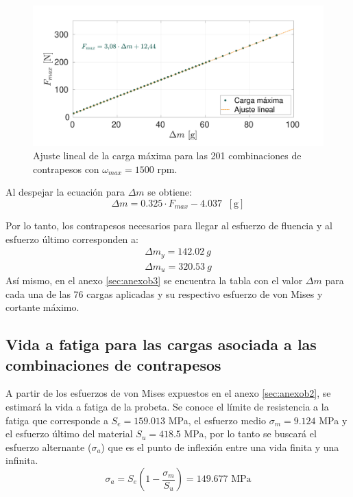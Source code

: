 \begin{figure}[h]
\centering
\includegraphics[width=1\linewidth, trim={1cm 0cm 2cm 0cm}, clip]{Imagenes/fmax_dmec.pdf}
\caption{Ajuste lineal de la carga máxima para las 201 combinaciones de contrapesos con $\omega_{max}=1500$ rpm.}
\label{fig:fmax_dmec}
\end{figure}
Al despejar la ecuación para $\Delta m$ se obtiene: 
\begin{equation}\label{eq:deltam}
	\Delta m = 0.325\cdot F_{max} - 4.037 \;\; [\text{g}]
\end{equation}

Por lo tanto, los contrapesos necesarios para llegar al esfuerzo de fluencia y al esfuerzo último corresponden a:
\begin{gather*}
	\Delta m_y = 142.02 \: g \\
	\Delta m_u = 320.53 \: g
\end{gather*}
Así mismo, en el anexo \ref{sec:anexob3} se encuentra la tabla con el valor $\Delta m$ para cada una de las 76 cargas aplicadas y su respectivo esfuerzo de von Mises y cortante máximo.

\subsection{Vida a fatiga para las cargas asociada a las combinaciones de contrapesos}

A partir de los esfuerzos de von Mises expuestos en el anexo \ref{sec:anexob2}, se estimará la vida a fatiga de la probeta. Se conoce el límite de resistencia a la fatiga que corresponde a $S_e = 159.013$ MPa, el esfuerzo medio $\sigma_m = 9.124$ MPa y el esfuerzo último del material $S_u = 418.5$ MPa, por lo tanto se buscará el esfuerzo alternante ($\sigma_a$) que es el punto de inflexión entre una vida finita y una infinita. 
\begin{equation}
 \sigma_a = S_e\left(1 - \frac{\sigma_m}{S_u}\right) = 149.677 \text{ MPa}
\end{equation} 

